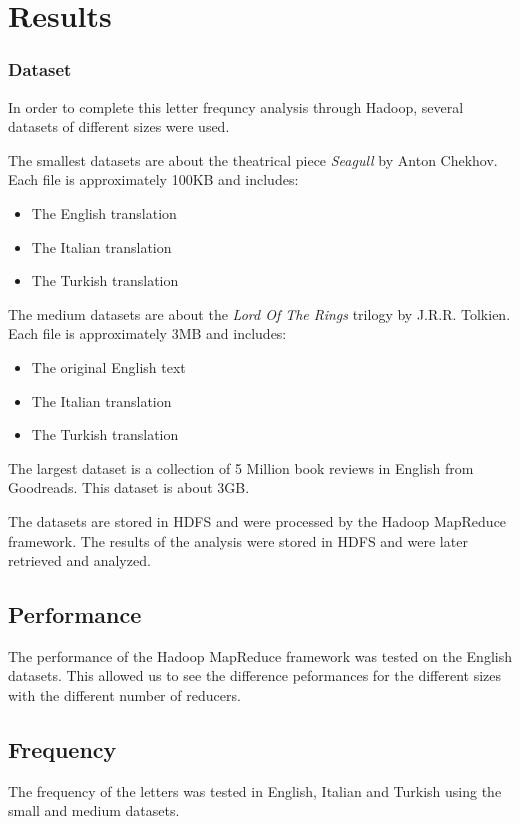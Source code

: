 \chapter{Results}

\subsection{Dataset}
In order to complete this letter frequncy analysis through Hadoop, several datasets of different sizes were used. 

The smallest datasets are about the theatrical piece \textit{Seagull} by Anton Chekhov. Each file is approximately 100KB and includes: 
\begin{itemize}
    \item The English translation
    \item The Italian translation
    \item The Turkish translation
\end{itemize}

The medium datasets are about the \textit{Lord Of The Rings} trilogy by J.R.R. Tolkien. Each file is approximately 3MB and includes: 
\begin{itemize}
    \item The original English text
    \item The Italian translation
    \item The Turkish translation
\end{itemize}

The largest dataset is a collection of 5 Million book reviews in English from Goodreads. This dataset is about 3GB. 
 
The datasets are stored in HDFS and were processed by the Hadoop MapReduce framework. The results of the analysis were stored in HDFS and were later retrieved and analyzed.

\section{Performance}
The performance of the Hadoop MapReduce framework was tested on the English datasets. This allowed us to see the difference peformances for the different sizes with the different number of reducers.

\section{Frequency}
The frequency of the letters was tested in English, Italian and Turkish using the small and medium datasets. 